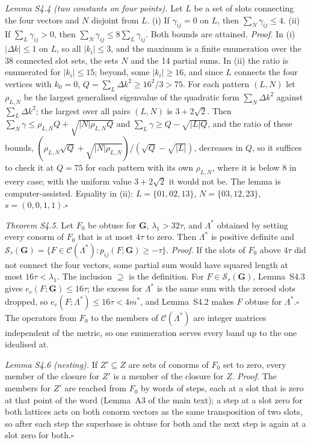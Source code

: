 \documentclass[preprint,pdf]{iucr}          %
\newcommand{\Gmet}{\mathbf{G}}
\newcommand{\Sw}{\mathcal{S}_\tau}
\newcommand{\Cl}{\mathcal{C}}
\begin{document}
\emph{Lemma S4.4 (two constants on four points).} Let $L$ be a set of slots connecting the four vectors and $N$ disjoint from $L$. (i) If $\gamma_{ij}=0$ on $L$, then $\sum_N\gamma_{ij}\le4$. (ii) If $\sum_L\gamma_{ij}>0$, then $\sum_N\gamma_{ij}\le8\sum_L\gamma_{ij}$. Both bounds are attained. \emph{Proof.} In (i) $|\Delta k|\le1$ on $L$, so all $|k_i|\le3$, and the maximum is a finite enumeration over the 38 connected slot sets, the sets $N$ and the 14 partial sums. In (ii) the ratio is enumerated for $|k_i|\le15$; beyond, some $|k_i|\ge16$, and since $L$ connects the four vertices with $k_0=0$, $Q=\sum_L\Delta k^2\ge16^2/3>75$. For each pattern $(L,N)$ let $\rho_{L,N}$ be the largest generalised eigenvalue of the quadratic form $\sum_N\Delta k^2$ against $\sum_L\Delta k^2$; the largest over all pairs $(L,N)$ is $3+2\sqrt2$. Then $\sum_N\gamma\le\rho_{L,N}Q+\sqrt{|N|\rho_{L,N}Q}$ and $\sum_L\gamma\ge Q-\sqrt{|L|Q}$, and the ratio of these bounds, $(\rho_{L,N}\sqrt Q+\sqrt{|N|\rho_{L,N}})/(\sqrt Q-\sqrt{|L|})$, decreases in $Q$, so it suffices to check it at $Q=75$ for each pattern with its own $\rho_{L,N}$, where it is below $8$ in every case; with the uniform value $3+2\sqrt2$ it would not be. The lemma is computer-assisted. Equality in (ii): $L=\{01,02,13\}$, $N=\{03,12,23\}$, $s=(0,0,1,1)$.\hfill$\square$

\emph{Theorem S4.5.} Let $F_0$ be obtuse for $\Gmet$, $\lambda_1>32\tau$, and $\Lambda^*$ obtained by setting every conorm of $F_0$ that is at most $4\tau$ to zero. Then $\Lambda^*$ is positive definite and $\Sw(\Gmet)=\{F\in\Cl(\Lambda^*):p_{ij}(F;\Gmet)\ge-\tau\}$. \emph{Proof.} If the slots of $F_0$ above $4\tau$ did not connect the four vectors, some partial sum would have squared length at most $16\tau<\lambda_1$. The inclusion $\supseteq$ is the definition. For $F\in\Sw(\Gmet)$, Lemma~S4.3 gives $e_c(F;\Gmet)\le16\tau$; the excess for $\Lambda^*$ is the same sum with the zeroed slots dropped, so $e_c(F;\Lambda^*)\le16\tau<4m^*$, and Lemma~S4.2 makes $F$ obtuse for $\Lambda^*$.\hfill$\square$ The operators from $F_0$ to the members of $\Cl(\Lambda^*)$ are integer matrices independent of the metric, so one enumeration serves every band up to the one idealised at.

\emph{Lemma S4.6 (nesting).} If $Z'\subseteq Z$ are sets of conorms of $F_0$ set to zero, every member of the closure for $Z'$ is a member of the closure for $Z$. \emph{Proof.} The members for $Z'$ are reached from $F_0$ by words of steps, each at a slot that is zero at that point of the word (Lemma~A3 of the main text); a step at a slot zero for both lattices acts on both conorm vectors as the same transposition of two slots, so after each step the superbase is obtuse for both and the next step is again at a slot zero for both.\hfill$\square$
\end{document}
